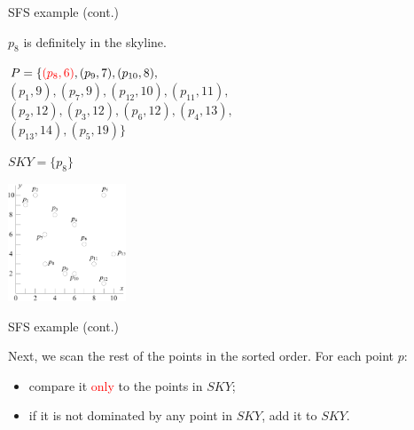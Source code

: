\documentclass{beamer}
\def\vgap{\vspace{5mm}}
\newcommand{\red}[1]{\textcolor{red}{#1}}
\begin{document}
    \begin{frame}{SFS example (cont.)}
    \begin{small} \label{fra:sfs-sort}
		$p_8$ is definitely in the skyline.

		\vgap

        \begin{minipage}[b]{0.5\linewidth}
            $P = \{\red{(p_8, 6)}, (p_9, 7), (p_{10}, 8),$ \\
            $(p_1, 9), (p_7, 9), (p_{12}, 10), (p_{11}, 11),$ \\
            $(p_2, 12), (p_3, 12), (p_6, 12), (p_4, 13),$ \\
            $(p_{13}, 14), (p_5, 19)\}$ \vspace{10mm}

			$SKY = \{p_8\}$
        \end{minipage}
        \begin{minipage}[b]{0.45\linewidth}
            \begin{center}
                \includegraphics[height=35mm]{./artwork/data.pdf}
            \end{center}
        \end{minipage}
    \end{small}
    \end{frame}
    \begin{frame}{SFS example (cont.)}
    \begin{small}
        Next, we scan the rest of the points in the sorted order. For each point $p$:
		\begin{itemize}
		    \item compare it \red{only} to the points in $SKY$;

			\item if it is not dominated by any point in $SKY$, add it to $SKY$.
		\end{itemize}
    \end{small}
    \end{frame}
\end{document}
